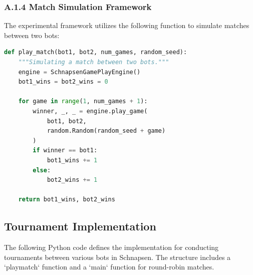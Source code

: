 \documentclass[runningheads]{llncs}
\begin{document}
\subsubsection{A.1.4 Match Simulation Framework}
The experimental framework utilizes the following function to simulate matches between two bots:

\begin{lstlisting}[language=Python, caption={Match Simulation Function}]
def play_match(bot1, bot2, num_games, random_seed):
    """Simulating a match between two bots."""
    engine = SchnapsenGamePlayEngine()
    bot1_wins = bot2_wins = 0

    for game in range(1, num_games + 1):
        winner, _, _ = engine.play_game(
            bot1, bot2, 
            random.Random(random_seed + game)
        )
        if winner == bot1:
            bot1_wins += 1
        else:
            bot2_wins += 1
            
    return bot1_wins, bot2_wins
\end{lstlisting}
\subsection{Tournament Implementation}
The following Python code defines the implementation for conducting tournaments between various bots in Schnapsen. The structure includes a `playmatch` function and a `main` function for round-robin matches.
\end{document}
